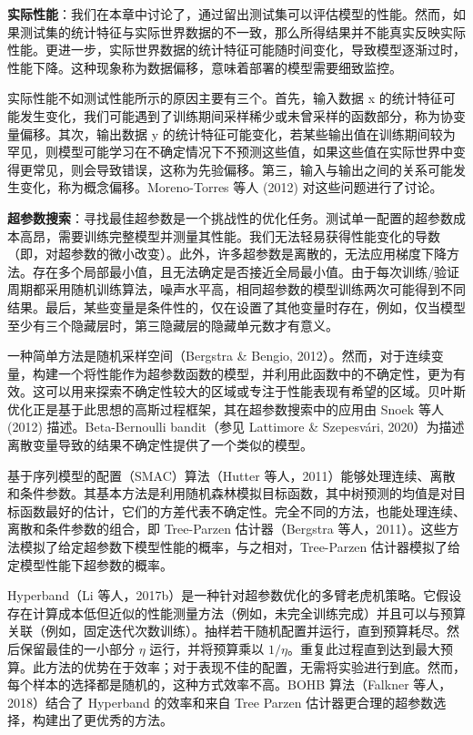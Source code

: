 \textbf{实际性能}：我们在本章中讨论了，通过留出测试集可以评估模型的性能。然而，如果测试集的统计特征与实际世界数据的不一致，那么所得结果并不能真实反映实际性能。更进一步，实际世界数据的统计特征可能随时间变化，导致模型逐渐过时，性能下降。这种现象称为数据偏移，意味着部署的模型需要细致监控。

实际性能不如测试性能所示的原因主要有三个。首先，输入数据 x 的统计特征可能发生变化，我们可能遇到了训练期间采样稀少或未曾采样的函数部分，称为协变量偏移。其次，输出数据 y 的统计特征可能变化，若某些输出值在训练期间较为罕见，则模型可能学习在不确定情况下不预测这些值，如果这些值在实际世界中变得更常见，则会导致错误，这称为先验偏移。第三，输入与输出之间的关系可能发生变化，称为概念偏移。Moreno-Torres 等人 (2012) 对这些问题进行了讨论。

\textbf{超参数搜索}：寻找最佳超参数是一个挑战性的优化任务。测试单一配置的超参数成本高昂，需要训练完整模型并测量其性能。我们无法轻易获得性能变化的导数（即，对超参数的微小改变）。此外，许多超参数是离散的，无法应用梯度下降方法。存在多个局部最小值，且无法确定是否接近全局最小值。由于每次训练/验证周期都采用随机训练算法，噪声水平高，相同超参数的模型训练两次可能得到不同结果。最后，某些变量是条件性的，仅在设置了其他变量时存在，例如，仅当模型至少有三个隐藏层时，第三隐藏层的隐藏单元数才有意义。

一种简单方法是随机采样空间（Bergstra \& Bengio, 2012）。然而，对于连续变量，构建一个将性能作为超参数函数的模型，并利用此函数中的不确定性，更为有效。这可以用来探索不确定性较大的区域或专注于性能表现有希望的区域。贝叶斯优化正是基于此思想的高斯过程框架，其在超参数搜索中的应用由 Snoek 等人 (2012) 描述。Beta-Bernoulli bandit（参见 Lattimore \& Szepesvári, 2020）为描述离散变量导致的结果不确定性提供了一个类似的模型。

基于序列模型的配置（SMAC）算法（Hutter 等人，2011）能够处理连续、离散和条件参数。其基本方法是利用随机森林模拟目标函数，其中树预测的均值是对目标函数最好的估计，它们的方差代表不确定性。完全不同的方法，也能处理连续、离散和条件参数的组合，即 Tree-Parzen 估计器（Bergstra 等人，2011）。这些方法模拟了给定超参数下模型性能的概率，与之相对，Tree-Parzen 估计器模拟了给定模型性能下超参数的概率。

Hyperband（Li 等人，2017b）是一种针对超参数优化的多臂老虎机策略。它假设存在计算成本低但近似的性能测量方法（例如，未完全训练完成）并且可以与预算关联（例如，固定迭代次数训练）。抽样若干随机配置并运行，直到预算耗尽。然后保留最佳的一小部分 \(\eta\) 运行，并将预算乘以 \(1/\eta\)。重复此过程直到达到最大预算。此方法的优势在于效率；对于表现不佳的配置，无需将实验进行到底。然而，每个样本的选择都是随机的，这种方式效率不高。BOHB 算法（Falkner 等人，2018）结合了 Hyperband 的效率和来自 Tree Parzen 估计器更合理的超参数选择，构建出了更优秀的方法。
